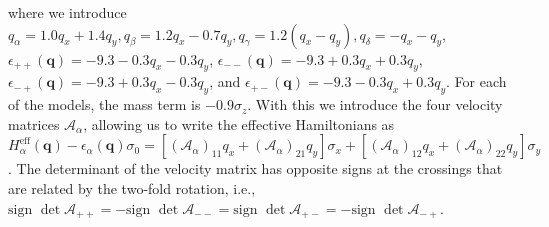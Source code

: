 \documentclass[aps,preprintnumbers,amsmath,amssymb]{revtex4-2}
\begin{document}
where we introduce $q_{\alpha} = 1.0q_x+1.4q_y, q_{\beta}=1.2q_x-0.7q_y, q_{\gamma} = 1.2(q_x-q_y), q_{\delta} = -q_x-q_y$, $\epsilon_{++}(\mathbf{q})=-9.3 - 0.3 q_x - 0.3 q_y$, $\epsilon_{--}(\mathbf{q})=-9.3 + 0.3 q_x + 0.3 q_y$, $\epsilon_{-+}(\mathbf{q})=-9.3 + 0.3 q_x - 0.3 q_y$,
and
$\epsilon_{+-}(\mathbf{q})=-9.3 - 0.3 q_x + 0.3 q_y$. For each of the models, the mass term is $-0.9\sigma_z$. With this we introduce
the four velocity matrices $\mathcal{A}_{\alpha}$, allowing us to write
the effective Hamiltonians as $H^{\textrm{eff}}_{\alpha}(\mathbf{q}) - \epsilon_{\alpha}(\mathbf{q}) \sigma_0 = [(\mathcal{A}_{\alpha})_{11}q_x+(\mathcal{A}_{\alpha})_{21}q_y]\sigma_x+[(\mathcal{A}_{\alpha})_{12}q_x+(\mathcal{A}_{\alpha})_{22}q_y]\sigma_y$. The determinant of the velocity matrix has opposite signs at the crossings that are related by the two-fold rotation, i.e.,  $\text{sign } \det \mathcal{A}_{++} = -\text{sign } \det \mathcal{A}_{--}=\text{sign } \det \mathcal{A}_{+-} = -\text{sign } \det \mathcal{A}_{-+}$.
\end{document}
